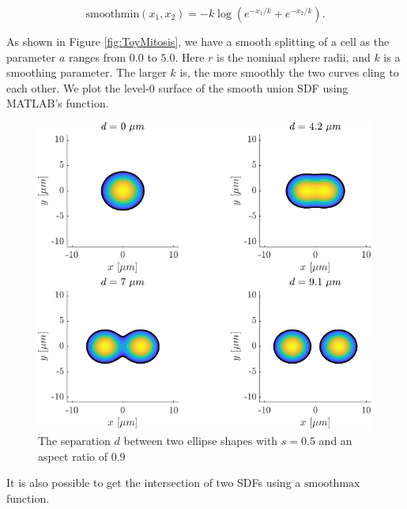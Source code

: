 \begin{equation}
    \textrm{smoothmin}(x_1, x_2) = -k \log(e^{-x_1/k} + e^{-x_2/k}).
\end{equation}

As shown in Figure \ref{fig:ToyMitosis}, we have a smooth splitting of a 
cell as the parameter $a$ ranges from $0.0$ to $5.0$. Here $r$ is the
nominal sphere radii, and $k$ is a smoothing parameter. The larger $k$ 
is, the more smoothly the two curves cling to each other. We plot the 
level-$0$ surface of the smooth union SDF using MATLAB's 
 function. 

\begin{figure}[!htb]
    \centering
    \includegraphics[width=\textwidth]{chapter1/figures/mitosisPlot.pdf}
    \caption{The separation $d$ between two ellipse shapes with $s = 0.5$ and 
    an aspect ratio of $0.9$}
    \label{fig:mitosisplot}
\end{figure}
\filbreak
It is also possible to get the intersection of two SDFs using a $\textrm{smoothmax}$ function.

